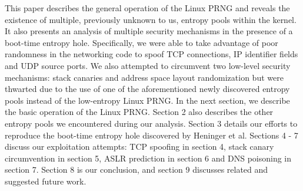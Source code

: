 This paper describes the general operation of the Linux PRNG and reveals the existence of multiple, previously unknown to us, entropy pools within the kernel.  It also presents an analysis of multiple security mechanisms in the presence of a boot-time entropy hole.  Specifically, we were able to take advantage of poor randomness in the networking code to spoof TCP connections, IP identifier fields and UDP source ports.  We also attempted to circumvent two low-level security mechanisms: stack canaries and address space layout randomization but were thwarted due to the use of one of the aforementioned newly discovered entropy pools instead of the low-entropy Linux PRNG.  
In the next section, we describe the basic operation of the Linux PRNG.  Section 2 also describes the other entropy pools we encountered during our analysis.  Section 3 details our efforts to reproduce the boot-time entropy hole discovered by Heninger et al.  Sections 4 - 7 discuss our exploitation attempts: TCP spoofing in section 4, stack canary circumvention in section 5, ASLR prediction in section 6 and DNS poisoning in section 7. Section 8 is our conclusion, and section 9 discusses related and suggested future work.








  
